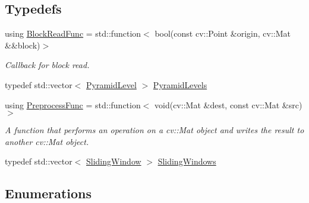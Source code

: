 \subsection*{Typedefs}
\begin{DoxyCompactItemize}
\item 
using \hyperlink{group___imagery_module_ga2238c2ef34502f68956ddef1f477ad95}{Block\+Read\+Func} = std\+::function$<$ bool(const cv\+::\+Point \&origin, cv\+::\+Mat \&\&block)$>$
\begin{DoxyCompactList}\small\item\em Callback for block read. \end{DoxyCompactList}\item 
typedef std\+::vector$<$ \hyperlink{structdg_1_1deepcore_1_1imagery_1_1_pyramid_level}{Pyramid\+Level} $>$ \hyperlink{namespacedg_1_1deepcore_1_1imagery_a19b24d2d9a7e8c5b4ab65d1fa42b8b20}{Pyramid\+Levels}
\item 
using \hyperlink{namespacedg_1_1deepcore_1_1imagery_ad59888e5453be057c25213ce51df1439}{Preprocess\+Func} = std\+::function$<$ void(cv\+::\+Mat \&dest, const cv\+::\+Mat \&src)$>$
\begin{DoxyCompactList}\small\item\em A function that performs an operation on a cv\+::\+Mat object and writes the result to another cv\+::\+Mat object. \end{DoxyCompactList}\item 
typedef std\+::vector$<$ \hyperlink{classdg_1_1deepcore_1_1imagery_1_1_sliding_window}{Sliding\+Window} $>$ \hyperlink{namespacedg_1_1deepcore_1_1imagery_af586b82f51aad0d30be6ee5671df62c5}{Sliding\+Windows}
\end{DoxyCompactItemize}
\subsection*{Enumerations}
